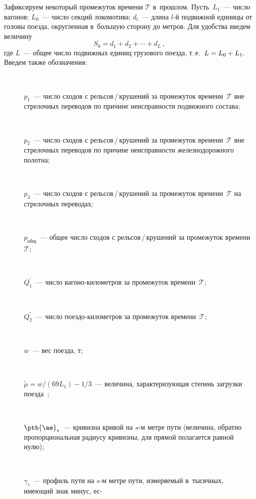 \begin{multicols}{2}
     Зафиксируем некоторый промежуток времени $\mathcal{T}$ в~прош\-лом. 
Пусть~$L_1$~--- чис\-ло вагонов; $L_0$~--- чис\-ло секций локомотива; $d_l$~--- 
длина $l$-й по\-движ\-ной единицы от головы поезда, округ\-лен\-ная в~большую 
сторону до мет\-ров. Для удобства введем величину 
$$
S_0= d_1+ d_2+ \cdots +d_L\,,
$$
 где $L$~--- общее чис\-ло по\-движ\-ных единиц грузового поезда, т.\,е.\ 
$L\hm= L_0\hm+ L_1$. Введем так\-же обозначения:
     \begin{description}
\item[\,] $p_1$~--- число сходов с рель\-сов\,/\,кру\-ше\-ний за промежуток 
времени~$\mathcal{T}$ вне стрелочных переводов по причине не\-ис\-прав\-ности 
подвижного состава; 
\item[\,] $p_2$~--- число сходов с рель\-сов\,/\,кру\-ше\-ний за промежуток 
времени~$\mathcal{T}$ вне стрелочных переводов по причине не\-ис\-прав\-ности 
железнодорожного полотна; 
\item[\,] $p_3$~--- число сходов с рель\-сов\,/\,кру\-ше\-ний за промежуток 
времени~$\mathcal{T}$ на стрелочных переводах; 
\item[\,] $p_{\mathrm{общ}}$~--- общее число сходов с рель\-сов\,/\,кру\-ше\-ний 
за промежуток времени~$\mathcal{T}$; 
\item[\,] $Q_{1}^\prime$~--- чис\-ло вагоно-ки\-ло\-мет\-ров за промежуток 
времени~$\mathcal{T}$; 
\item[\,] $Q_{2}^\prime$~--- чис\-ло поездо-ки\-ло\-мет\-ров за промежуток 
времени~$\mathcal{T}$; 
\item[\,] $w$~--- вес поезда, т; 
\item[\,] $\tilde{\mu}=w/(69L_1)-1/3$~--- величина, ха\-рак\-те\-ри\-зу\-ющая степень 
за\-груз\-ки поезда~\cite{7-bos};
\item[\,] $\ptb{\ae}_s$~--- кривизна кривой на $s$-м мет\-ре пути (величина, 
обрат\-но пропорциональная радиусу кривизны, для прямой полагается рав\-ной 
нулю); 
\item[\,] $\gamma_s$~--- профиль пути на $s$-м метре пути, из\-ме\-ря\-емый 
в~тысячных, имеющий знак минус, ес-\linebreak\vspace*{-12pt}

\pagebreak


\end{description}
\end{multicols}
